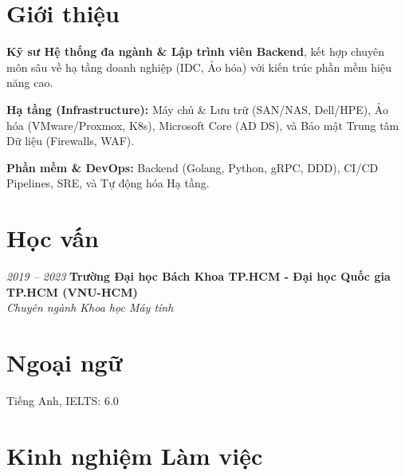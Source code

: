 \section{Giới thiệu}
\begin{onecolentry}
    \begin{highlights}
        \item \textbf{Kỹ sư Hệ thống đa ngành \& Lập trình viên Backend}, kết hợp chuyên môn sâu về hạ tầng doanh nghiệp (IDC, Ảo hóa) với kiến trúc phần mềm hiệu năng cao.
        \item \textbf{Hạ tầng (Infrastructure):} Máy chủ \& Lưu trữ (SAN/NAS, Dell/HPE), Ảo hóa (VMware/Proxmox, K8s), Microsoft Core (AD DS), và Bảo mật Trung tâm Dữ liệu (Firewalls, WAF).
        \item \textbf{Phần mềm \& DevOps:} Backend (Golang, Python, gRPC, DDD), CI/CD Pipelines, SRE, và Tự động hóa Hạ tầng.
    \end{highlights}
\end{onecolentry}

\section{Học vấn}
\begin{twocolentry}{\textit{2019 -- 2023}}
    \textbf{Trường Đại học Bách Khoa TP.HCM - Đại học Quốc gia TP.HCM (VNU-HCM)}\\[4pt]
    \textit{Chuyên ngành Khoa học Máy tính}
\end{twocolentry}

\section{Ngoại ngữ}
\begin{onecolentry}
    \begin{highlights}
        \item Tiếng Anh, IELTS: 6.0
    \end{highlights}
\end{onecolentry}

\section{Kinh nghiệm Làm việc}


